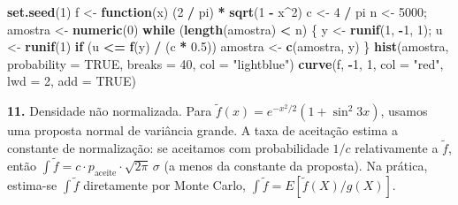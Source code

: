 \documentclass[
  portuguese,
  11pt,
  openany]{book}
\newenvironment{Shaded}{\begin{snugshade}}{\end{snugshade}}
\newcommand{\AttributeTok}[1]{\textcolor[rgb]{0.13,0.29,0.53}{#1}}
\newcommand{\ConstantTok}[1]{\textcolor[rgb]{0.56,0.35,0.01}{#1}}
\newcommand{\ControlFlowTok}[1]{\textcolor[rgb]{0.13,0.29,0.53}{\textbf{#1}}}
\newcommand{\DecValTok}[1]{\textcolor[rgb]{0.00,0.00,0.81}{#1}}
\newcommand{\FloatTok}[1]{\textcolor[rgb]{0.00,0.00,0.81}{#1}}
\newcommand{\FunctionTok}[1]{\textcolor[rgb]{0.13,0.29,0.53}{\textbf{#1}}}
\newcommand{\NormalTok}[1]{#1}
\newcommand{\OtherTok}[1]{\textcolor[rgb]{0.56,0.35,0.01}{#1}}
\newcommand{\SpecialCharTok}[1]{\textcolor[rgb]{0.81,0.36,0.00}{\textbf{#1}}}
\newcommand{\StringTok}[1]{\textcolor[rgb]{0.31,0.60,0.02}{#1}}
\begin{document}
\begin{Shaded}
\begin{Highlighting}[]
\FunctionTok{set.seed}\NormalTok{(}\DecValTok{1}\NormalTok{)}
\NormalTok{f }\OtherTok{\textless{}{-}} \ControlFlowTok{function}\NormalTok{(x) (}\DecValTok{2} \SpecialCharTok{/}\NormalTok{ pi) }\SpecialCharTok{*} \FunctionTok{sqrt}\NormalTok{(}\DecValTok{1} \SpecialCharTok{{-}}\NormalTok{ x}\SpecialCharTok{\^{}}\DecValTok{2}\NormalTok{)}
\NormalTok{c }\OtherTok{\textless{}{-}} \DecValTok{4} \SpecialCharTok{/}\NormalTok{ pi}
\NormalTok{n }\OtherTok{\textless{}{-}} \DecValTok{5000}\NormalTok{; amostra }\OtherTok{\textless{}{-}} \FunctionTok{numeric}\NormalTok{(}\DecValTok{0}\NormalTok{)}
\ControlFlowTok{while}\NormalTok{ (}\FunctionTok{length}\NormalTok{(amostra) }\SpecialCharTok{\textless{}}\NormalTok{ n) \{}
\NormalTok{  y }\OtherTok{\textless{}{-}} \FunctionTok{runif}\NormalTok{(}\DecValTok{1}\NormalTok{, }\SpecialCharTok{{-}}\DecValTok{1}\NormalTok{, }\DecValTok{1}\NormalTok{); u }\OtherTok{\textless{}{-}} \FunctionTok{runif}\NormalTok{(}\DecValTok{1}\NormalTok{)}
  \ControlFlowTok{if}\NormalTok{ (u }\SpecialCharTok{\textless{}=} \FunctionTok{f}\NormalTok{(y) }\SpecialCharTok{/}\NormalTok{ (c }\SpecialCharTok{*} \FloatTok{0.5}\NormalTok{)) amostra }\OtherTok{\textless{}{-}} \FunctionTok{c}\NormalTok{(amostra, y)}
\NormalTok{\}}
\FunctionTok{hist}\NormalTok{(amostra, }\AttributeTok{probability =} \ConstantTok{TRUE}\NormalTok{, }\AttributeTok{breaks =} \DecValTok{40}\NormalTok{, }\AttributeTok{col =} \StringTok{"lightblue"}\NormalTok{)}
\FunctionTok{curve}\NormalTok{(f, }\SpecialCharTok{{-}}\DecValTok{1}\NormalTok{, }\DecValTok{1}\NormalTok{, }\AttributeTok{col =} \StringTok{"red"}\NormalTok{, }\AttributeTok{lwd =} \DecValTok{2}\NormalTok{, }\AttributeTok{add =} \ConstantTok{TRUE}\NormalTok{)}
\end{Highlighting}
\end{Shaded}

\textbf{11.} Densidade não normalizada. Para \(\tilde f(x) = e^{-x^2/2}(1 + \sin^2 3x)\),
usamos uma proposta normal de variância grande. A taxa de aceitação estima a
constante de normalização: se aceitamos com probabilidade \(1/c\) relativamente a
\(\tilde f\), então \(\int \tilde f = c \cdot p_{\text{aceite}} \cdot \sqrt{2\pi}\,\sigma\)
(a menos da constante da proposta). Na prática, estima-se \(\int \tilde f\)
diretamente por Monte Carlo, \(\int \tilde f = E[\tilde f(X)/g(X)]\).
\end{document}
